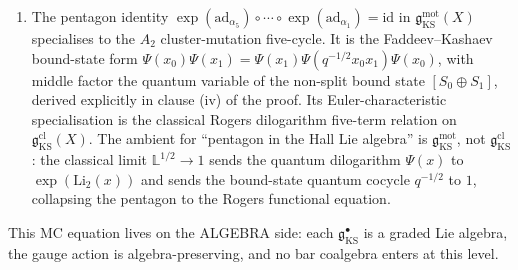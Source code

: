\begin{theorem}
\begin{enumerate}[label=\textup{(\roman*)}]
 \begin{itemize}
 \item on $\mathfrak{g}_{\mathrm{KS}}^{\mathrm{mot}}(X)$, as the
 closedness of the motivic DT generating series against the
 $q$-commutator Hall bracket (KS 2008 Section~4);
 \item on $\mathfrak{g}_{\mathrm{KS}}^{\mathrm{cl}}(X)$, as the
 closedness of the numerical DT generating series against the
 Euler-characteristic Hall bracket (Joyce--Song 2011,
 Theorem~5.3, ``no-pole theorem'').
 \end{itemize}
 The two MC equations are intertwined by the
 Euler-characteristic specialisation.
 \item The pentagon identity
 $\exp(\mathrm{ad}_{\alpha_5}) \circ \cdots \circ
 \exp(\mathrm{ad}_{\alpha_1}) = \mathrm{id}$
 in $\mathfrak{g}_{\mathrm{KS}}^{\mathrm{mot}}(X)$ specialises to
 the $A_2$ cluster-mutation five-cycle. It is the Faddeev--Kashaev
 bound-state form
 $\Psi(x_0)\Psi(x_1) = \Psi(x_1)\Psi(q^{-1/2} x_0 x_1)\Psi(x_0)$,
 with middle factor the quantum variable of the non-split bound
 state $[S_0 \oplus S_1]$, derived explicitly in clause (iv) of
 the proof. Its Euler-characteristic specialisation is the
 classical Rogers dilogarithm five-term relation on
 $\mathfrak{g}_{\mathrm{KS}}^{\mathrm{cl}}(X)$. The ambient for
 ``pentagon in the Hall Lie algebra'' is
 $\mathfrak{g}_{\mathrm{KS}}^{\mathrm{mot}}$, not
 $\mathfrak{g}_{\mathrm{KS}}^{\mathrm{cl}}$: the classical limit
 $\mathbb{L}^{1/2} \to 1$ sends the quantum dilogarithm $\Psi(x)$
 to $\exp(\mathrm{Li}_2(x))$ and sends the bound-state quantum
 cocycle $q^{-1/2}$ to $1$, collapsing the pentagon to the Rogers
 functional equation.
\end{enumerate}
This MC equation lives on the ALGEBRA side: each $\mathfrak{g}_{\mathrm{KS}}^\bullet$
is a graded Lie algebra, the gauge action is algebra-preserving, and
no bar coalgebra enters at this level.
\end{theorem}

